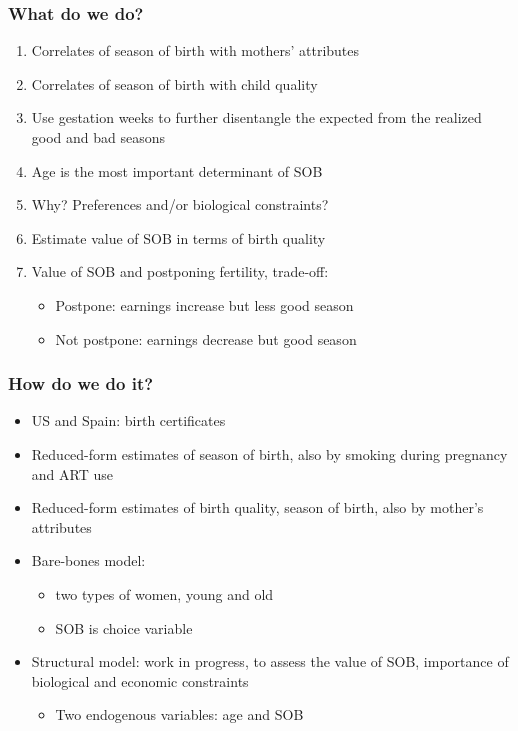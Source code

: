 \documentclass[10pt,letterpaper,subeqn]{beamer}
\begin{document}
\begin{frame}[label=map]
\frametitle{What do we do?}

\begin{enumerate}
\item Correlates of season of birth with mothers' attributes
\item Correlates of season of birth with child quality
\item Use gestation weeks to further disentangle the expected from the realized good and bad seasons
\item Age is the most important determinant of SOB
\item Why? Preferences and/or biological constraints?
\item Estimate value of SOB in terms of birth quality 
\item Value of SOB and postponing fertility, trade-off:
      \begin{itemize}
       \item Postpone: earnings increase but less good season
       \item Not postpone: earnings decrease but good season
      \end{itemize}
\end{enumerate}
\end{frame}



\begin{frame}[label=how]
\frametitle{How do we do it?}

\begin{itemize}
\item US and Spain: birth certificates
\item Reduced-form estimates of season of birth, also by smoking during pregnancy and ART use
\item Reduced-form estimates of birth quality, season of birth, also by mother's attributes
\item Bare-bones model:
      \begin{itemize}
        \item two types of women, young and old
        \item SOB is choice variable
      \end{itemize}
\item Structural model: work in progress, to assess the value of SOB, importance of 
biological and economic constraints
      \begin{itemize}
        \item Two endogenous variables: age and SOB 
      \end{itemize}
\end{itemize}
\end{frame}
\end{document}
